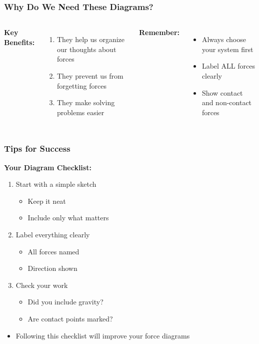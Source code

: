 \documentclass{beamer}
\begin{document}
\begin{frame}
\frametitle{Why Do We Need These Diagrams?}
\begin{columns}
\textbf{Key Benefits:}
\pause
\begin{enumerate}
    \item They help us organize our thoughts about forces
    \pause
    \item They prevent us from forgetting forces
    \pause
    \item They make solving problems easier
\end{enumerate}
\pause

\vspace{0.3cm}
\textbf{Remember:}
\begin{itemize}
    \item Always choose your system first
    \item Label ALL forces clearly
    \item Show contact and non-contact forces
\end{itemize}

\end{columns}
\end{frame}

\begin{frame}
\frametitle{Tips for Success}
\textbf{Your Diagram Checklist:}
\pause
\begin{enumerate}
    \item Start with a simple sketch
    \pause
    \begin{itemize}
        \item[\Square] Keep it neat
        \item[\Square] Include only what matters
    \end{itemize}
    \pause
    
    \item Label everything clearly
    \pause
    \begin{itemize}
        \item[\Square] All forces named
        \item[\Square] Direction shown
    \end{itemize}
    \pause
    
    \item Check your work
    \pause
    \begin{itemize}
        \item[\Square] Did you include gravity?
        \item[\Square] Are contact points marked?
    \end{itemize}
\end{enumerate}
\pause
\begin{itemize}
    \item Following this checklist will improve your force diagrams
\end{itemize}
\end{frame}
\end{document}
